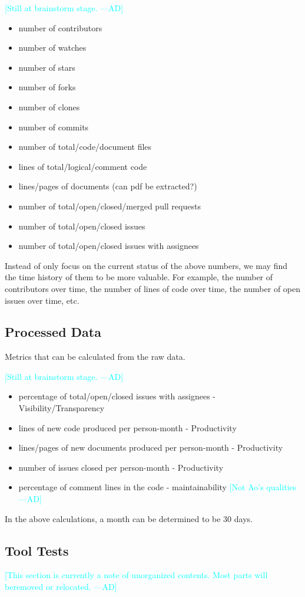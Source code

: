 \documentclass[letterpaper,cleveref]{lipics-v2019}
\newcommand{\authornote}[3]{\textcolor{#1}{[#3 ---#2]}}
\newcommand{\authornote}[3]{}
\newcommand{\ad}[1]{\authornote{cyan}{AD}{#1}} %
\theoremstyle{definition}
\begin{document}
\ad{Still at brainstorm stage.}
\begin{itemize}
\item number of contributors
\item number of watches
\item number of stars
\item number of forks
\item number of clones
\item number of commits
\item number of total/code/document files
\item lines of total/logical/comment code
\item lines/pages of documents (can pdf be extracted?)
\item number of total/open/closed/merged pull requests
\item number of total/open/closed issues
\item number of total/open/closed issues with assignees
\end{itemize}

Instead of only focus on the current status of the above numbers, we may find
the time history of them to be more valuable. For example, the number of
contributors over time, the number of lines of code over time, the number of
open issues over time, etc.

\subsection{Processed Data}
Metrics that can be calculated from the raw data.

\ad{Still at brainstorm stage.}
\begin{itemize}
\item percentage of total/open/closed issues with assignees -
Visibility/Transparency
\item lines of new code produced per person-month - Productivity
\item lines/pages of new documents produced per person-month - Productivity
\item number of issues closed per person-month - Productivity
\item percentage of comment lines in the code - maintainability \ad{Not Ao's
qualities}
\end{itemize}

In the above calculations, a month can be determined to be 30 days.

\subsection{Tool Tests}
\ad{This section is currently a note of unorganized contents. Most parts will beremoved or relocated.}
\end{document}
